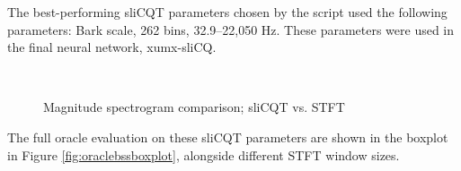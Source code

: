 \documentclass[report.tex]{subfiles}
\begin{document}
The best-performing sliCQT parameters chosen by the script used the following parameters: Bark scale, 262 bins, 32.9--22,050 Hz. These parameters were used in the final neural network, xumx-sliCQ.

\begin{figure}[ht]
	\centering
	\\
	\caption{Magnitude spectrogram comparison; sliCQT vs. STFT}
	\label{fig:bipolarslicqs}
\end{figure}

The full oracle evaluation on these sliCQT parameters are shown in the boxplot in Figure \ref{fig:oraclebssboxplot}, alongside different STFT window sizes.
\end{document}
